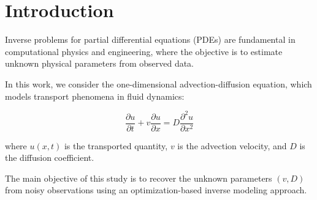 \section{Introduction}

Inverse problems for partial differential equations (PDEs) are fundamental in computational physics and engineering, where the objective is to estimate unknown physical parameters from observed data.

In this work, we consider the one-dimensional advection-diffusion equation, which models transport phenomena in fluid dynamics:

\[
\frac{\partial u}{\partial t} + v \frac{\partial u}{\partial x} = D \frac{\partial^2 u}{\partial x^2}
\]

where $u(x,t)$ is the transported quantity, $v$ is the advection velocity, and $D$ is the diffusion coefficient.

The main objective of this study is to recover the unknown parameters $(v, D)$ from noisy observations using an optimization-based inverse modeling approach.